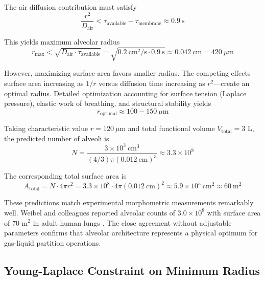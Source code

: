 \documentclass[10pt,twocolumn,a4paper]{article}
\theoremstyle{remark}
\begin{document}
The air diffusion contribution must satisfy
\begin{equation}
\frac{r^{2}}{D_{\mathrm{air}}} < \tau_{\mathrm{available}} - \tau_{\mathrm{membrane}} \approx 0.9~\mathrm{s}
\end{equation}

This yields maximum alveolar radius
\begin{equation}
r_{\mathrm{max}} < \sqrt{D_{\mathrm{air}} \cdot \tau_{\mathrm{available}}} = \sqrt{0.2~\mathrm{cm}^{2}/\mathrm{s} \cdot 0.9~\mathrm{s}} \approx 0.042~\mathrm{cm} = 420~\mu\mathrm{m}
\end{equation}

However, maximizing surface area favors smaller radius. The competing effects—surface area increasing as $1/r$ versus diffusion time increasing as $r^{2}$—create an optimal radius. Detailed optimization accounting for surface tension (Laplace pressure), elastic work of breathing, and structural stability yields
\begin{equation}
r_{\mathrm{optimal}} \approx 100-150~\mu\mathrm{m}
\end{equation}

Taking characteristic value $r = 120~\mu$m and total functional volume $V_{\mathrm{total}} = 3$ L, the predicted number of alveoli is
\begin{equation}
N = \frac{3 \times 10^{3}~\mathrm{cm}^{3}}{(4/3)\pi(0.012~\mathrm{cm})^{3}} \approx 3.3 \times 10^{8}
\end{equation}

The corresponding total surface area is
\begin{equation}
A_{\mathrm{total}} = N \cdot 4\pi r^{2} = 3.3 \times 10^{8} \cdot 4\pi(0.012~\mathrm{cm})^{2} \approx 5.9 \times 10^{5}~\mathrm{cm}^{2} \approx 60~\mathrm{m}^{2}
\end{equation}

These predictions match experimental morphometric measurements remarkably well. Weibel and colleagues reported alveolar counts of $3.0 \times 10^{8}$ with surface area of 70 m$^{2}$ in adult human lungs \cite{weibel1963morphometry}. The close agreement without adjustable parameters confirms that alveolar architecture represents a physical optimum for gas-liquid partition operations.

\subsection{Young-Laplace Constraint on Minimum Radius}
\end{document}

